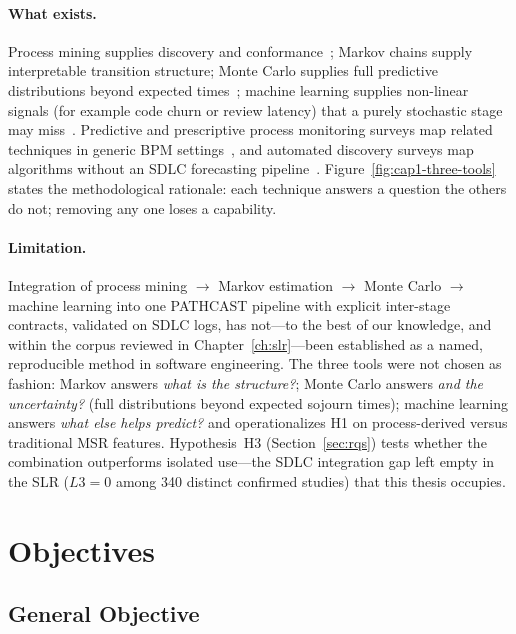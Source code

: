 \paragraph{What exists.}
Process mining supplies discovery and conformance~\cite{aalst2016process};
Markov chains supply interpretable transition structure;
Monte Carlo supplies full predictive distributions beyond expected
times~\cite{vacanti2015};
machine learning supplies non-linear signals (for example code churn or
review latency) that a purely stochastic stage may miss~\cite{hassan2008road}.
Predictive and prescriptive process monitoring surveys map related
techniques in generic BPM settings~\cite{marquezChamorro2018,kubrak2022},
and automated discovery surveys map algorithms without an SDLC
forecasting pipeline~\cite{augusto2019}.
Figure~\ref{fig:cap1-three-tools} states the methodological rationale:
each technique answers a question the others do not; removing any one
loses a capability.



\paragraph{Limitation.}
Integration of process mining $\rightarrow$ Markov estimation
$\rightarrow$ Monte Carlo $\rightarrow$ machine learning into one
PATHCAST pipeline with explicit inter-stage contracts, validated on
SDLC logs, has not---to the best of our knowledge, and within the corpus
reviewed in Chapter~\ref{ch:slr}---been established as a named, reproducible
method in
software engineering.
The three tools were not chosen as fashion:
Markov answers \emph{what is the structure?};
Monte Carlo answers \emph{and the uncertainty?} (full distributions beyond
expected sojourn times);
machine learning answers \emph{what else helps predict?} and operationalizes
H1 on process-derived versus traditional MSR features.
Hypothesis~H3 (Section~\ref{sec:rqs}) tests whether the combination
outperforms isolated use---the SDLC integration gap left empty in the SLR
($L3=0$ among 340 distinct confirmed studies) that this thesis occupies.


\section{Objectives}
\label{sec:objectives}

\subsection{General Objective}

